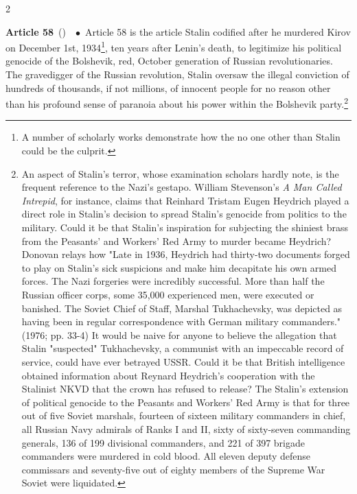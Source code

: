 \documentclass[10pt,a4paper,twoside]{article} %
\newcommand{\entry}[4]{\markboth{#1}{#1}\textbf{#1}\ {(#2)}\ \textit{#3}\ $\bullet$\ {#4}}  %
\begin{document}
\begin{multicols}{2}
{} 

\entry{Article 58} {} {} {Article 58 is the article Stalin codified after he murdered Kirov on December 1st, 1934\footnote{A number of scholarly works demonstrate how the no one other than Stalin could be the culprit.}, ten years after Lenin's death, to legitimize his political genocide of the Bolshevik, red, October generation of Russian revolutionaries. The gravedigger of the Russian revolution, Stalin oversaw the illegal conviction of hundreds of thousands, if not millions, of innocent people for no reason other than his profound sense of paranoia about his power within the Bolshevik party.\footnote{An aspect of Stalin's terror, whose examination scholars hardly note, is the frequent reference to the Nazi's gestapo. William Stevenson's \textenglish{\emph{A Man Called Intrepid}}, for instance, claims that Reinhard Tristam Eugen Heydrich played a direct role in Stalin's decision to spread Stalin's genocide from politics to the military. Could it be that Stalin's inspiration for subjecting the shiniest brass from the Peasants' and Workers' Red Army to murder became Heydrich? Donovan relays how "Late in 1936, Heydrich had thirty-two documents forged to play on Stalin’s sick suspicions and make him decapitate his own armed forces. The Nazi forgeries were incredibly successful. More than half the Russian officer corps, some 35,000 experienced men, were executed or banished. The Soviet Chief of Staff, Marshal Tukhachevsky, was depicted as having been in regular correspondence with German military commanders." (1976; pp. 33-4) It would be naive for anyone to believe the allegation that Stalin "suspected" Tukhachevsky, a communist with an impeccable record of service, could have ever betrayed USSR.  Could it be that British intelligence obtained information about Reynard Heydrich's cooperation with the Stalinist NKVD that the crown has refused to release? The Stalin's extension of political genocide to the Peasants and Workers' Red Army is that for three out of five Soviet marshals, fourteen of sixteen military commanders in chief, all Russian Navy admirals of Ranks I and II, sixty of sixty-seven commanding generals, 136 of 199 divisional commanders, and 221 of 397 brigade commanders were murdered in cold blood. All eleven deputy defense commissars and seventy-five out of eighty members of the Supreme War Soviet were
liquidated.}
}


\end{multicols}
\end{document}
